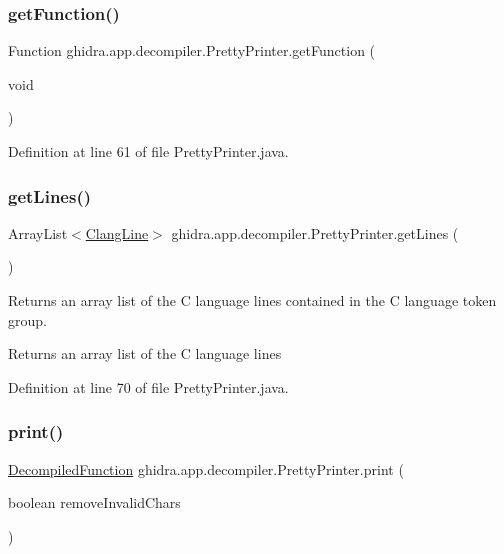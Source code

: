 \subsubsection{\texorpdfstring{getFunction()}{getFunction()}}
{\footnotesize\ttfamily Function ghidra.\+app.\+decompiler.\+Pretty\+Printer.\+get\+Function (\begin{DoxyParamCaption}\item[{void}]{ }\end{DoxyParamCaption})\hspace{0.3cm}{\ttfamily [inline]}}



Definition at line 61 of file Pretty\+Printer.\+java.

\mbox{\label{classghidra_1_1app_1_1decompiler_1_1_pretty_printer_a5103857b7766874f3020fc59e4f616f2}} 
\subsubsection{\texorpdfstring{getLines()}{getLines()}}
{\footnotesize\ttfamily Array\+List$<$\mbox{\hyperlink{classghidra_1_1app_1_1decompiler_1_1_clang_line}{Clang\+Line}}$>$ ghidra.\+app.\+decompiler.\+Pretty\+Printer.\+get\+Lines (\begin{DoxyParamCaption}{ }\end{DoxyParamCaption})\hspace{0.3cm}{\ttfamily [inline]}}

Returns an array list of the C language lines contained in the C language token group. \begin{DoxyReturn}{Returns}
an array list of the C language lines 
\end{DoxyReturn}


Definition at line 70 of file Pretty\+Printer.\+java.

\mbox{\label{classghidra_1_1app_1_1decompiler_1_1_pretty_printer_ad36d28e52e9493186ac184c569f19fa9}} 
\subsubsection{\texorpdfstring{print()}{print()}}
{\footnotesize\ttfamily \mbox{\hyperlink{classghidra_1_1app_1_1decompiler_1_1_decompiled_function}{Decompiled\+Function}} ghidra.\+app.\+decompiler.\+Pretty\+Printer.\+print (\begin{DoxyParamCaption}\item[{boolean}]{remove\+Invalid\+Chars }\end{DoxyParamCaption})\hspace{0.3cm}{\ttfamily [inline]}}

